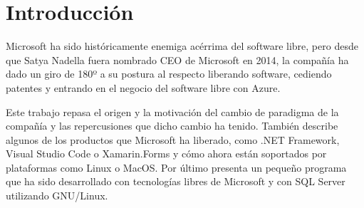 \section{Introducción}
Microsoft ha sido históricamente enemiga acérrima del software libre, pero desde que Satya Nadella fuera nombrado CEO de Microsoft en 2014, la compañía ha dado un giro de 180º a su postura al respecto liberando software, cediendo patentes y entrando en el negocio del software libre con Azure.

Este trabajo repasa el origen y la motivación del cambio de paradigma de la compañía y las repercusiones que dicho cambio ha tenido. También describe algunos de los productos que Microsoft ha liberado, como .NET Framework, Visual Studio Code o Xamarin.Forms y cómo ahora están soportados por plataformas como Linux o MacOS. Por último presenta un pequeño programa que ha sido desarrollado con tecnologías libres de Microsoft y con SQL Server utilizando GNU/Linux.